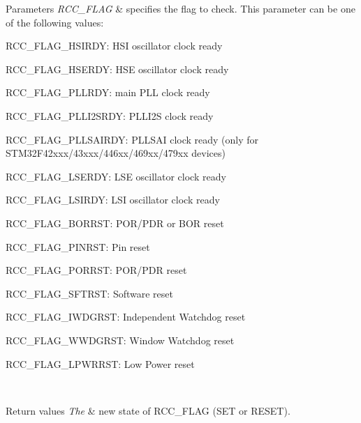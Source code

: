 \begin{DoxyParams}{Parameters}
{\em R\+C\+C\+\_\+\+F\+L\+AG} & specifies the flag to check. This parameter can be one of the following values\+: \begin{DoxyItemize}
\item R\+C\+C\+\_\+\+F\+L\+A\+G\+\_\+\+H\+S\+I\+R\+DY\+: H\+SI oscillator clock ready \item R\+C\+C\+\_\+\+F\+L\+A\+G\+\_\+\+H\+S\+E\+R\+DY\+: H\+SE oscillator clock ready \item R\+C\+C\+\_\+\+F\+L\+A\+G\+\_\+\+P\+L\+L\+R\+DY\+: main P\+LL clock ready \item R\+C\+C\+\_\+\+F\+L\+A\+G\+\_\+\+P\+L\+L\+I2\+S\+R\+DY\+: P\+L\+L\+I2S clock ready \item R\+C\+C\+\_\+\+F\+L\+A\+G\+\_\+\+P\+L\+L\+S\+A\+I\+R\+DY\+: P\+L\+L\+S\+AI clock ready (only for S\+T\+M32\+F42xxx/43xxx/446xx/469xx/479xx devices) \item R\+C\+C\+\_\+\+F\+L\+A\+G\+\_\+\+L\+S\+E\+R\+DY\+: L\+SE oscillator clock ready \item R\+C\+C\+\_\+\+F\+L\+A\+G\+\_\+\+L\+S\+I\+R\+DY\+: L\+SI oscillator clock ready \item R\+C\+C\+\_\+\+F\+L\+A\+G\+\_\+\+B\+O\+R\+R\+ST\+: P\+O\+R/\+P\+DR or B\+OR reset \item R\+C\+C\+\_\+\+F\+L\+A\+G\+\_\+\+P\+I\+N\+R\+ST\+: Pin reset \item R\+C\+C\+\_\+\+F\+L\+A\+G\+\_\+\+P\+O\+R\+R\+ST\+: P\+O\+R/\+P\+DR reset \item R\+C\+C\+\_\+\+F\+L\+A\+G\+\_\+\+S\+F\+T\+R\+ST\+: Software reset \item R\+C\+C\+\_\+\+F\+L\+A\+G\+\_\+\+I\+W\+D\+G\+R\+ST\+: Independent Watchdog reset \item R\+C\+C\+\_\+\+F\+L\+A\+G\+\_\+\+W\+W\+D\+G\+R\+ST\+: Window Watchdog reset \item R\+C\+C\+\_\+\+F\+L\+A\+G\+\_\+\+L\+P\+W\+R\+R\+ST\+: Low Power reset \end{DoxyItemize}
\\
\hline
\end{DoxyParams}

\begin{DoxyRetVals}{Return values}
{\em The} & new state of R\+C\+C\+\_\+\+F\+L\+AG (S\+ET or R\+E\+S\+ET). \\
\hline
\end{DoxyRetVals}
\mbox{\label{group___r_c_c_ga6126c99f398ee4be410ad76ae3aee18f}} 
